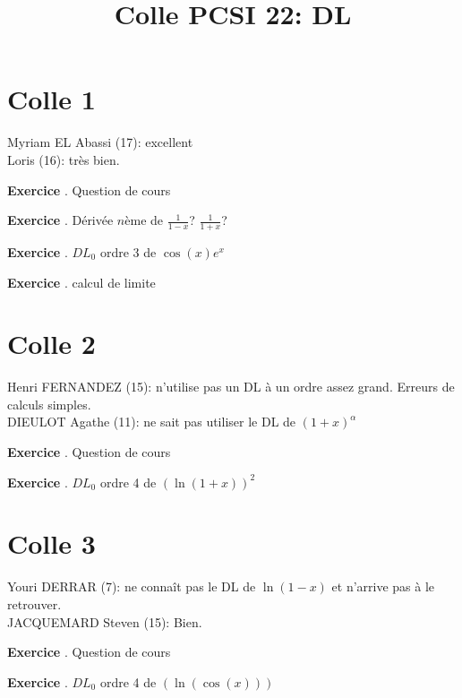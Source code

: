 \documentclass[10pt,a4paper]{article}
\title{Colle PCSI 22: DL}
\newcounter{question}
\newcounter{exo}
\newenvironment{exo}{\vspace{0.5cm}\setcounter{question}{0}\addtocounter{exo}{1} \noindent \textbf{Exercice \theexo}. \normalsize }{\par}
\begin{document}
	\maketitle
\section*{Colle 1}
\setcounter{exo}{0}
	Myriam EL Abassi (17): excellent\\
	Loris (16): très bien.\\
	\begin{exo}
		Question de cours
	\end{exo}
	
	\begin{exo}
		Dérivée $n$ème de $\frac{1}{1 - x}$? $\frac{1}{1 + x}$?
 	\end{exo}

	\begin{exo}
		$DL_0$ ordre 3 de $\cos(x) e^x$
	\end{exo}

	\begin{exo}
		calcul de limite
	\end{exo}
	
	\section*{Colle 2}
	Henri FERNANDEZ (15): n'utilise pas un DL à un ordre assez grand. Erreurs de calculs simples.  \\
	DIEULOT Agathe (11): ne sait pas utiliser le DL de $(1+x)^\alpha$\\
	
	\begin{exo}
		Question de cours
	\end{exo}
	
	\begin{exo}
		$DL_0$ ordre 4 de $(\ln(1+x))^2$ 
	\end{exo}

	\section*{Colle 3}
	\setcounter{exo}{0}
	Youri DERRAR (7): ne connaît pas le DL de $\ln(1-x)$ et n'arrive pas à le retrouver.\\
	JACQUEMARD Steven (15): Bien.\\
	
	\begin{exo}
		Question de cours
	\end{exo}
			
	\begin{exo}
		$DL_0$ ordre 4 de $(\ln(\cos(x)))$ 
	\end{exo}
	
\end{document}
